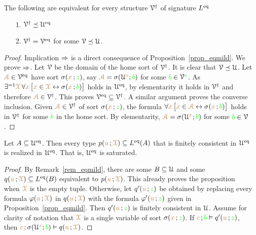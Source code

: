 \begin{proposition}
The following are equivalent for every structure $\V^\dag$ of signature $L^\eq$\nobreak
\begin{itemize}
\item[1.] $\V^\dag\preceq\U^\eq$
\item[2.] $\V^\dag=\V^\eq$ for some $\V\preceq\U$.
\end{itemize}
\end{proposition}
\begin{proof}
Implication $\IMP$ is a direct consequence of Proposition~\ref{prop_eqmild}.
We prove $\IMP$.
Let $\V$ be the domain of the home sort of $\V^\dag$.
It is clear that $\V\preceq\U$.
Let ${\vl\Aa}\in\V^\eq$ have sort $\sigma({\mr x}\,;{\gr z})$, say ${\vl\Aa}=\sigma(\U^{\mr x};{\gr b})$ for some ${\gr b}\in\V^{\gr z}$.
As $\E^{=1}{\vl\X}\, \A{\mr x}\,\big[{\mr x}\in{\vl\X}\iff\sigma({\mr x}\,;{\gr b})\big]$ holds in $\U^\eq$, by elementarity it holds in $\V^\dag$ and therefore ${\vl\Aa}\in\V^\dag$.
This proves $\V^\eq\subseteq\V^\dag$.
A similar argument proves the converse inclusion.
Given ${\vl\Aa}\in\V^\dag$ of sort $\sigma({\mr x}\,;{\gr z})$, the formula $\A{\mr x}\,\big[{\mr x}\in{\vl\Aa}\iff\sigma({\mr x}\,;{\gr b})\big]$ holds in $\V^\dag$ for some ${\gr b}$ in the home sort.
%
By elementarity, ${\vl\Aa}=\sigma(\U^{\mr x};{\gr b})$ for some ${\gr b}\in\V$.
\end{proof}

\begin{proposition}\label{prop_Ueq_saturated}
Let $A\subseteq\U^\eq$.
Then every type $p({\mr u}\,;{\vl\X})\subseteq L^\eq(A)$ that is finitely consistent in $\U^\eq$ is realized in $\U^\eq$.
That is, $\U^\eq$ is saturated.
\end{proposition}
\begin{proof}
By Remark~\ref{rem_eqmild}, there are some $B\subseteq\U$ and some $q({\mr u}\,;{\vl\X})\subseteq L^\eq(B)$ equivalent to $p({\mr u}\,;{\vl\X})$.
This already proves the proposition when ${\vl\X}$ is the empty tuple.
Otherwise, let $q'({\mr u}\,;{\gr z})$ be obtained by replacing every formula $\phi({\mr u}\,;{\vl\X})$ in $q({\mr u}\,;{\vl\X})$ with the formula $\phi'({\mr u}\,;{\gr z})$ given in Proposition~\ref{prop_eqmild}.
Then $q'({\mr u}\,;{\gr z})$ is finitely consistent in $\U$.
Assume for clarity of notation that ${\vl\X}$ is a single variable of sort $\sigma({\mr x}\,;{\gr z})$.
If ${\mr c}\,;{\gr b}\models q'({\mr u}\,;{\gr z})$, then  ${\mr c}\,;\sigma(\U^{\mr x};{\gr b})\models q({\mr u}\,;{\vl\X})$.
\end{proof}



